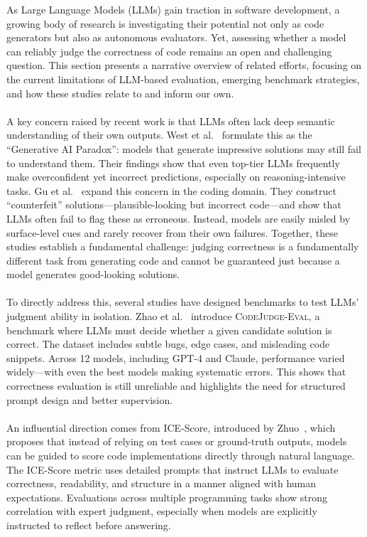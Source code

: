 \documentclass[a4paper]{usiinfbachelorproject}
\begin{document}
As Large Language Models (LLMs) gain traction in software development, a growing body of research is investigating their potential not only as code generators but also as autonomous evaluators. Yet, assessing whether a model can reliably judge the correctness of code remains an open and challenging question. This section presents a narrative overview of related efforts, focusing on the current limitations of LLM-based evaluation, emerging benchmark strategies, and how these studies relate to and inform our own.\\
\\[2pt]
A key concern raised by recent work is that LLMs often lack deep semantic understanding of their own outputs. West et al.~\cite{west2023generative} formulate this as the “Generative AI Paradox”: models that generate impressive solutions may still fail to understand them. Their findings show that even top-tier LLMs frequently make overconfident yet incorrect predictions, especially on reasoning-intensive tasks. Gu et al.~\cite{gu2024counterfeit} expand this concern in the coding domain. They construct “counterfeit” solutions—plausible-looking but incorrect code—and show that LLMs often fail to flag these as erroneous. Instead, models are easily misled by surface-level cues and rarely recover from their own failures. Together, these studies establish a fundamental challenge: judging correctness is a fundamentally different task from generating code and cannot be guaranteed just because a model generates good-looking solutions.\\
\\[2pt]
To directly address this, several studies have designed benchmarks to test LLMs' judgment ability in isolation. Zhao et al.~\cite{zhao2024codejudgeeval} introduce \textsc{CodeJudge-Eval}, a benchmark where LLMs must decide whether a given candidate solution is correct. The dataset includes subtle bugs, edge cases, and misleading code snippets. Across 12 models, including GPT-4 and Claude, performance varied widely—with even the best models making systematic errors. This shows that correctness evaluation is still unreliable and highlights the need for structured prompt design and better supervision.\\
\\[2pt]
An influential direction comes from ICE-Score, introduced by Zhuo~\cite{zhuo2023icescore}, which proposes that instead of relying on test cases or ground-truth outputs, models can be guided to score code implementations directly through natural language. The ICE-Score metric uses detailed prompts that instruct LLMs to evaluate correctness, readability, and structure in a manner aligned with human expectations. Evaluations across multiple programming tasks show strong correlation with expert judgment, especially when models are explicitly instructed to reflect before answering.\\
\end{document}
